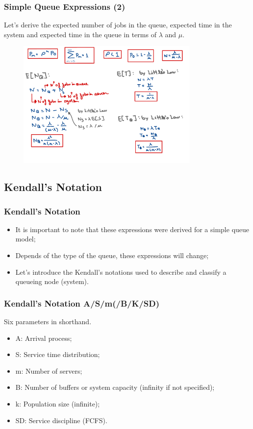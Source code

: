 \begin{frame}
    \frametitle{Simple Queue Expressions (2)}
    Let's derive the expected number of jobs in the queue, expected time in the system and
    expected time in the queue in terms of $\lambda$ and $\mu$.

    \begin{figure}
        \centering
        \includegraphics[width=0.8\textwidth]{slides/figures/simple_queue_expected_time.pdf}
    \end{figure}
\end{frame}

\subsection{Kendall's Notation}

\begin{frame}
    \frametitle{Kendall's Notation}
    \begin{itemize}
        \item It is important to note that these expressions were derived for 
        a simple queue model;

        \item Depends of the type of the queue, these expressions will change;

        \item Let's introduce the Kendall's notations used to describe and classify a queueing node (system).
    
    \end{itemize}

\end{frame}

\begin{frame}
    \frametitle{Kendall's Notation A/S/m(/B/K/SD)}
    Six parameters in shorthand.
    \begin{itemize}
        \item A: Arrival process;
        \item S: Service time distribution;
        \item m: Number of servers;
        \item B: Number of buffers or system capacity (infinity if not specified);
        \item k: Population size (infinite);
        \item SD: Service discipline (FCFS).
    \end{itemize}
\end{frame}



